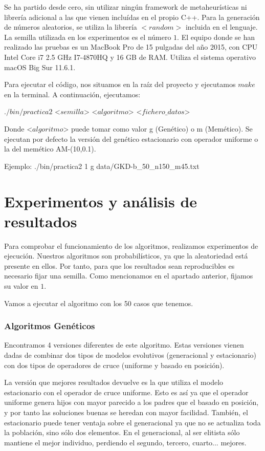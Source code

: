 Se ha partido desde cero, sin utilizar ningún framework de metaheurísticas ni librería adicional a las que vienen incluídas en el propio C++. Para la generación de números aleatorios, se utiliza la librería $<random>$ incluida en el lenguaje. La semilla utilizada en los experimentos es el número $1$. El equipo donde se han realizado las pruebas es un MacBook Pro de 15 pulgadas del año 2015, con CPU Intel Core i7 2.5 GHz I7-4870HQ y 16 GB de RAM. Utiliza el sistema operativo macOS Big Sur 11.6.1.

Para ejecutar el código, nos situamos en la raíz del proyecto y ejecutamos $make$ en la terminal. A continuación, ejecutamos:

\noindent $./bin/practica2$ <$semilla$> \space <$algoritmo$> \space <$fichero\_datos$>

\noindent Donde <$algoritmo$> \space puede tomar como valor g (Genético) o m (Memético). Se ejecutan por defecto la versión del genético estacionario con operador uniforme o la del memético AM-(10,0.1).

\noindent Ejemplo: ./bin/practica2 1 g data/GKD-b\_50\_n150\_m45.txt


\part{Experimentos y análisis de resultados}
Para comprobar el funcionamiento de los algoritmos, realizamos experimentos de ejecución. Nuestros algoritmos son probabilísticos, ya que la aleatoriedad está presente en ellos. Por tanto, para que los resultados sean reproducibles es necesario fijar una semilla. Como mencionamos en el apartado anterior, fijamos su valor en $1$. 

Vamos a ejecutar el algoritmo con los 50 casos que tenemos.

\section{Algoritmos Genéticos}
Encontramos 4 versiones diferentes de este algoritmo. Estas versiones vienen dadas de combinar dos tipos de modelos evolutivos (generacional y estacionario) con dos tipos de operadores de cruce (uniforme y basado en posición).

La versión que mejores resultados devuelve es la que utiliza el modelo estacionario con el operador de cruce uniforme. Esto es así ya que el operador uniforme genera hijos con mayor parecido a los padres que el basado en posición, y por tanto las soluciones buenas se heredan con mayor facilidad. También, el estacionario puede tener ventaja sobre el generacional ya que no se actualiza toda la población, sino sólo dos elementos. En el generacional, al ser elitista sólo mantiene el mejor individuo, perdiendo el segundo, tercero, cuarto... mejores.

